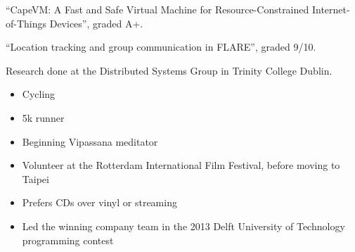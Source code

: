 “CapeVM: A Fast and Safe Virtual Machine for Resource-Constrained Internet-of-Things Devices”, graded A+.

\medskip


“Location tracking and group communication in FLARE”, graded 9/10.

\medskip

Research done at the Distributed Systems Group in Trinity College Dublin.







\begin{itemize}
\item\small{Cycling}
\item\small{5k runner}
\item\small{Beginning Vipassana meditator}
\item\small{Volunteer at the Rotterdam International Film Festival, before moving to Taipei}
\item\small{Prefers CDs over vinyl or streaming}
\item\small{Led the winning company team in the 2013 Delft University of Technology programming contest}
\end{itemize}






